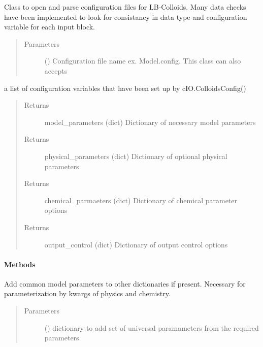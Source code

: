 \documentclass[letterpaper,10pt,english]{sphinxmanual}
\begin{document}

\begin{fulllineitems}
\label{\detokenize{index:lb_colloids.Colloids.Colloid_IO.Config}}
Class to open and parse configuration files for LB-Colloids. Many data checks
have been implemented to look for consistancy in data type and
configuration variable for each input block.
\begin{quote}\begin{description}
\item[{Parameters}] \leavevmode
{} () \textendash{} Configuration file name ex. Model.config. This class can also accepts

\end{description}\end{quote}

a list of configuration variables that have been set up by cIO.ColloidsConfig()
\begin{quote}\begin{description}
\item[{Returns}] \leavevmode
model\_parameters (dict) Dictionary of necessary model parameters

\item[{Returns}] \leavevmode
physical\_parameters (dict) Dictionary of optional physical parameters

\item[{Returns}] \leavevmode
chemical\_parmaeters (dict) Dictionary of chemical parameter options

\item[{Returns}] \leavevmode
output\_control (dict) Dictionary of output control options

\end{description}\end{quote}
\paragraph{Methods}

\begin{fulllineitems}
\label{\detokenize{index:lb_colloids.Colloids.Colloid_IO.Config.add_universal_parameters}}
Add common model parameters to other dictionaries if present. Necessary for parameterization by
kwargs of physics and chemistry.
\begin{quote}\begin{description}
\item[{Parameters}] \leavevmode
{} () \textendash{} dictionary to add set of universal paramameters from the required parameters


\end{description}
\end{quote}
\end{fulllineitems}
\end{fulllineitems}
\end{document}
